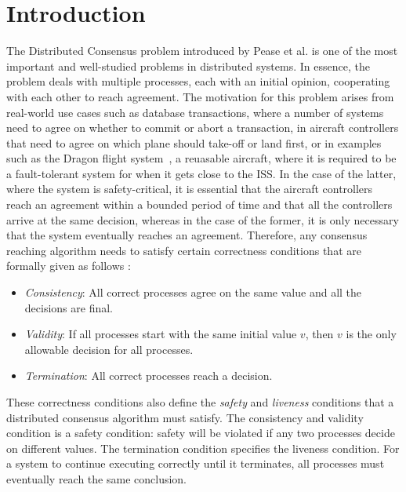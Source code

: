 ﻿
\section{Introduction}

The Distributed Consensus problem introduced by Pease et al.
\cite{PeaseSL80} is one of the most important and well-studied problems in
distributed systems. In essence, the problem deals with multiple processes,
each with an initial opinion, cooperating with each other to reach agreement.
The motivation for this problem arises from real-world use cases such as database
transactions, where a number of systems need to agree on whether to commit or
abort a transaction, in aircraft controllers that need to agree on which plane
should take-off or land first, or in examples such as the Dragon flight
system~\cite{dfs}, a reuasable aircraft, where it is required to be
a fault-tolerant system for when it gets close to the ISS. In the case of the
latter, where the system is safety-critical, it is essential that the aircraft
controllers reach an agreement within a bounded period of time and that all the
controllers arrive at the same decision, whereas in the case of the former, it
is only necessary that the system eventually reaches an agreement. Therefore,
any consensus reaching algorithm needs to satisfy certain correctness
conditions that are formally given as follows \cite{PeaseSL80}:

\begin{itemize} \item \textit{Consistency}: All correct processes agree on the
        same value and all the decisions are final.  
    \item \textit{Validity}:
        If all processes start with the same initial value $v$, then $v$ is the
    only allowable decision for all processes.  
\item \textit{Termination}: All
        correct processes reach a decision.  \end{itemize}


These correctness conditions also define the \textit{safety} and \textit{liveness}
conditions that a distributed consensus algorithm must satisfy.  The
consistency and validity condition is a safety condition: safety will be
violated if any two processes decide on different values. The termination
condition specifies the liveness condition. For a system to continue executing
correctly until it terminates, all processes must eventually reach the same
conclusion.

